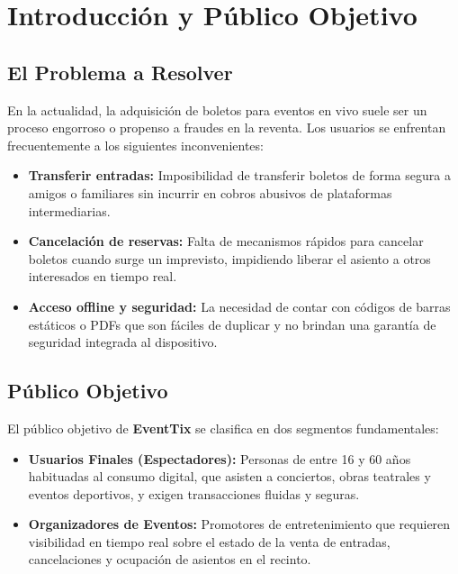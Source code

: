\section{Introducción y Público Objetivo}

\subsection{El Problema a Resolver}
En la actualidad, la adquisición de boletos para eventos en vivo suele ser un proceso engorroso o propenso a fraudes en la reventa. Los usuarios se enfrentan frecuentemente a los siguientes inconvenientes:
\begin{itemize}
    \item \textbf{Transferir entradas:} Imposibilidad de transferir boletos de forma segura a amigos o familiares sin incurrir en cobros abusivos de plataformas intermediarias.
    \item \textbf{Cancelación de reservas:} Falta de mecanismos rápidos para cancelar boletos cuando surge un imprevisto, impidiendo liberar el asiento a otros interesados en tiempo real.
    \item \textbf{Acceso offline y seguridad:} La necesidad de contar con códigos de barras estáticos o PDFs que son fáciles de duplicar y no brindan una garantía de seguridad integrada al dispositivo.
\end{itemize}

\subsection{Público Objetivo}
El público objetivo de \textbf{EventTix} se clasifica en dos segmentos fundamentales:
\begin{itemize}
    \item \textbf{Usuarios Finales (Espectadores):} Personas de entre 16 y 60 años habituadas al consumo digital, que asisten a conciertos, obras teatrales y eventos deportivos, y exigen transacciones fluidas y seguras.
    \item \textbf{Organizadores de Eventos:} Promotores de entretenimiento que requieren visibilidad en tiempo real sobre el estado de la venta de entradas, cancelaciones y ocupación de asientos en el recinto.
\end{itemize}

